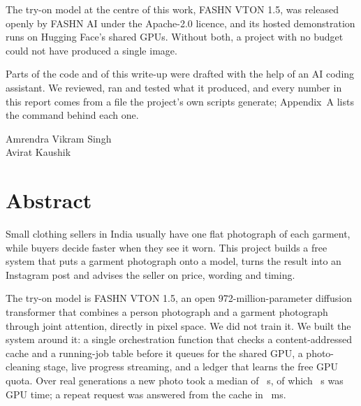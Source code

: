 \documentclass[12pt,a4paper,oneside]{report}
\begin{document}
The try-on model at the centre of this work, FASHN VTON 1.5, was released openly by FASHN AI under the Apache-2.0 licence, and its hosted demonstration runs on Hugging Face's shared GPUs. Without both, a project with no budget could not have produced a single image.

Parts of the code and of this write-up were drafted with the help of an AI coding assistant. We reviewed, ran and tested what it produced, and every number in this report comes from a file the project's own scripts generate; Appendix~A lists the command behind each one.

\vspace{18mm}
\begin{flushright}Amrendra Vikram Singh\\Avirat Kaushik\end{flushright}

\chapter*{Abstract}
Small clothing sellers in India usually have one flat photograph of each garment, while buyers decide faster when they see it worn. This project builds a free system that puts a garment photograph onto a model, turns the result into an Instagram post and advises the seller on price, wording and timing.

The try-on model is FASHN VTON 1.5, an open 972-million-parameter diffusion transformer that combines a person photograph and a garment photograph through joint attention, directly in pixel space. We did not train it. We built the system around it: a single orchestration function that checks a content-addressed cache and a running-job table before it queues for the shared GPU, a photo-cleaning stage, live progress streaming, and a ledger that learns the free GPU quota. Over \vNRuns{} real generations a new photo took a median of \vMedTotal{}~s, of which \vMedGpu{}~s was GPU time; a repeat request was answered from the cache in \vCacheMs{}~ms.
\end{document}
